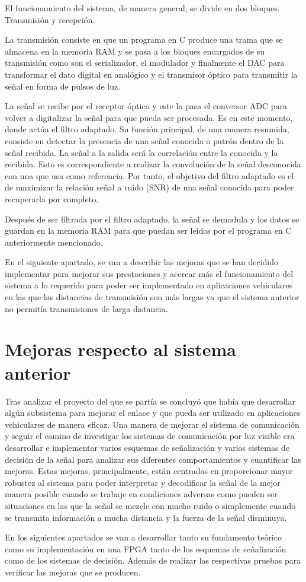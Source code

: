 El funcionamiento del sistema, de manera general, se divide en dos bloques. Transmisión y 
recepción. 

La transmisión consiste en que un programa en C 
produce una trama que se almacena en la memoria RAM y se pasa a los bloques encargados
de su transmisión como son el serializador, el modulador y finalmente el DAC para 
transformar el dato digital en analógico y el transmisor óptico para transmitir la señal
en forma de pulsos de luz. 

La señal se recibe por el receptor óptico y este la pasa el conversor ADC para volver 
a digitalizar la señal para que pueda ser procesada. Es en este momento, donde actúa el 
filtro adaptado. Su función principal, de una manera resumida, consiste en detectar la 
presencia de una señal conocida o patrón dentro de la señal recibida. La señal a la
salida será la correlación entre la conocida y la recibida. Esto es correspondiente
a realizar la convolución de la señal desconocida con una que usa como referencia.
Por tanto, el objetivo del filtro adaptado es el de maximizar la relación señal a ruido 
(SNR) de una señal conocida para poder recuperarla por completo.

Después de  ser filtrada por el filtro adaptado, la señal se demodula y los datos se 
guardan
en la memoria RAM para que puedan ser leídos por el programa en C anteriormente mencionado.

En el siguiente apartado, se van a describir las mejoras que se han decidido
implementar para mejorar sus prestaciones y acercar más el funcionamiento del sistema 
a lo requerido para poder ser implementado en aplicaciones vehiculares en las que las 
distancias de transmisión son más largas ya que el sistema anterior no permitía 
transmisiones de larga distancia. 

\section{Mejoras respecto al sistema anterior}
Tras analizar el proyecto del que se partía se concluyó que había que desarrollar algún 
subsistema para mejorar el enlace y que pueda ser utilizado en aplicaciones
vehiculares de manera eficaz. Una manera de mejorar el 
sistema de comunicación y seguir el camino de investigar los sistemas de comunicación por 
luz visible era desarrollar e implementar varios esquemas de señalización y varios sistemas
de decisión de la señal para analizar sus diferentes comportamientos y cuantificar las 
mejoras. Estas mejoras, principalmente, están centradas en proporcionar mayor robustez al 
sistema para poder interpretar y decodificar la señal de la mejor manera posible cuando
se trabaje en condiciones adversas como pueden ser situaciones en las que la señal se 
mezcle con mucho ruido o simplemente cuando se transmita información a mucha distancia y 
la fuerza de la señal disminuya.

En los siguientes apartados se van a desarrollar tanto su fundamento teórico como su 
implementación en una FPGA tanto de los esquemas de señalización como de los 
sistemas de decisión. Además de realizar las respectivas pruebas para verificar las
mejoras que se producen.

\chapterend{}
